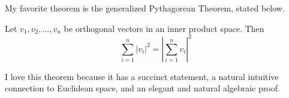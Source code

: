 \documentclass[letterpaper]{article}
\title{}
\author{Trevor Klar}
\begin{document}
\maketitle

My favorite theorem is the generalized Pythagorean Theorem, stated below. 
\begin{theorem*}
Let $v_1, v_2, \ldots, v_n$ be orthogonal vectors in an inner product space. Then 
$$\sum_{i=1}^n |v_i|^2=\left|\sum_{i=1}^n v_i\right|^2$$
\end{theorem*}

I love this theorem because it has a succinct statement, a natural intuitive connection to Euclidean space, and an elegant and natural algebraic proof. 
\end{document}
